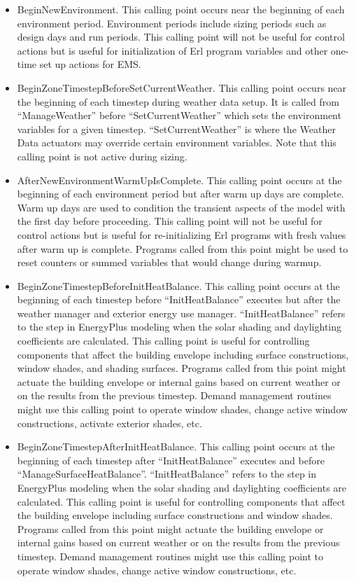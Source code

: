 \begin{itemize}
\item
  BeginNewEnvironment. This calling point occurs near the beginning of each environment period. Environment periods include sizing periods such as design days and run periods. This calling point will not be useful for control actions but is useful for initialization of Erl program variables and other one-time set up actions for EMS.
\item
  BeginZoneTimestepBeforeSetCurrentWeather. This calling point occurs near the beginning of each timestep during weather data setup. It is called from ``ManageWeather'' before ``SetCurrentWeather'' which sets the environment variables for a given timestep. ``SetCurrentWeather'' is where the Weather Data actuators may override certain environment variables. Note that this calling point is not active during sizing.
\item
  AfterNewEnvironmentWarmUpIsComplete. This calling point occurs at the beginning of each environment period but after warm up days are complete. Warm up days are used to condition the transient aspects of the model with the first day before proceeding. This calling point will not be useful for control actions but is useful for re-initializing Erl programs with fresh values after warm up is complete. Programs called from this point might be used to reset counters or summed variables that would change during warmup.
\item
  BeginZoneTimestepBeforeInitHeatBalance. This calling point occurs at the beginning of each timestep before ``InitHeatBalance'' executes but after the weather manager and exterior energy use manager. ``InitHeatBalance'' refers to the step in EnergyPlus modeling when the solar shading and daylighting coefficients are calculated. This calling point is useful for controlling components that affect the building envelope including surface constructions, window shades, and shading surfaces. Programs called from this point might actuate the building envelope or internal gains based on current weather or on the results from the previous timestep. Demand management routines might use this calling point to operate window shades, change active window constructions, activate exterior shades, etc.

\item
  BeginZoneTimestepAfterInitHeatBalance. This calling point occurs at the beginning of each timestep after ``InitHeatBalance'' executes and before ``ManageSurfaceHeatBalance''. ``InitHeatBalance'' refers to the step in EnergyPlus modeling when the solar shading and daylighting coefficients are calculated. This calling point is useful for controlling components that affect the building envelope including surface constructions and window shades. Programs called from this point might actuate the building envelope or internal gains based on current weather or on the results from the previous timestep. Demand management routines might use this calling point to operate window shades, change active window constructions, etc.


\end{itemize}

